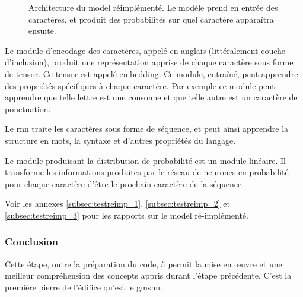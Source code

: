 \begin{figure}[h]
	\centering
	\scalebox{1}{}
	\caption[Architecture du  réimplémenté]{Architecture du \gls{model} réimplémenté. Le modèle prend en entrée des caractères, et produit des probabilités sur quel caractère apparaîtra ensuite.}\label{fig:reimplement}
\end{figure}

Le module d'encodage des caractères, appelé  en anglais (littéralement \og couche d'inclusion\fg{}), produit une représentation apprise de chaque caractère sous forme de \gls{tensor}. Ce \gls{tensor} est appelé \gls{embedding}. Ce module, entraîné, peut apprendre des propriétés spécifiques à chaque caractère. Par exemple ce module peut apprendre que telle lettre est une consonne et que telle autre est un caractère de ponctuation. \label{def:embeding}

Le \gls{rnn} traite les caractères sous forme de séquence, et peut ainsi apprendre la structure en mots, la syntaxe et d'autres propriétés du langage.

Le module produisant la distribution de probabilité est un module linéaire.
Il transforme les informations produites par le réseau de neurones en probabilité pour chaque caractère d'être le prochain caractère de la séquence. %

Voir les annexes \ref{subsec:testreimp_1}, \ref{subsec:testreimp_2} et \ref{subsec:testreimp_3} pour les rapports sur le \gls{model} ré-implémenté. 

\subsubsection{Conclusion}
Cette étape, outre la préparation du code, à permit la mise en œuvre et une meilleur compréhension des concepts appris durant l’étape précédente. C'est la première pierre de l'édifice qu'est le \gls{gmsnn}.